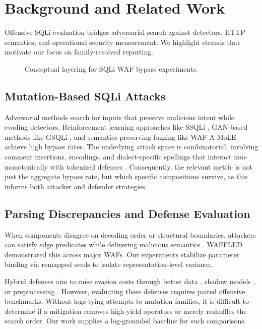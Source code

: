 \section{Background and Related Work}
\label{sec:background}
Offensive SQLi evaluation bridges adversarial search against detectors, HTTP semantics, and operational security measurement. We highlight strands that motivate our focus on family-resolved reporting.

\begin{figure}[t]
  \centering
  \caption{Conceptual layering for SQLi WAF bypass experiments.}
  \label{fig:related-taxonomy}
\end{figure}

\subsection{Mutation-Based SQLi Attacks}
Adversarial methods search for inputs that preserve malicious intent while evading detectors. Reinforcement learning approaches like SSQLi \cite{guan2023ssqli}, GAN-based methods like GSQLi \cite{khan2024gsqli}, and semantics-preserving fuzzing like WAF-A-MoLE \cite{demetrio2020wafamole} achieve high bypass rates. The underlying attack space is combinatorial, involving comment insertions, encodings, and dialect-specific spellings that interact non-monotonically with tokenized defenses \cite{mutation-sqli}. Consequently, the relevant metric is not just the aggregate bypass rate, but which specific compositions survive, as this informs both attacker and defender strategies.

\subsection{Parsing Discrepancies and Defense Evaluation}
When components disagree on decoding order or structural boundaries, attackers can satisfy edge predicates while delivering malicious semantics \cite{akhavani2025waffled}. WAFFLED demonstrated this across major WAFs. Our experiments stabilize parameter binding via remapped seeds to isolate representation-level variance. 

Hybrid defenses aim to raise evasion costs through better data \cite{elebiary2026wamm}, shadow models \cite{wu2025wafbooster}, or preprocessing \cite{zhang2026bwafsql}. However, evaluating these defenses requires paired offensive benchmarks. Without logs tying attempts to mutation families, it is difficult to determine if a mitigation removes high-yield operators or merely reshuffles the search order. Our work supplies a log-grounded baseline for such comparisons.

